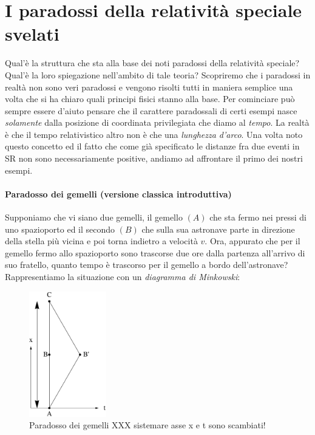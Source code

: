 \documentclass[twoside]{article}
\begin{document}
\section{I paradossi della relatività speciale svelati}\label{sec:paradoxes}
Qual'è la struttura che sta alla base dei noti paradossi della relatività speciale? Qual'è la loro spiegazione nell'ambito di tale teoria? Scopriremo che i paradossi in realtà non sono veri paradossi e vengono risolti tutti in maniera semplice una volta che si ha chiaro quali principi fisici stanno alla base. Per cominciare può sempre essere d'aiuto pensare che il carattere paradossali di certi esempi nasce \emph{solamente} dalla posizione di coordinata privilegiata che diamo al \emph{tempo}. La realtà è che il tempo relativistico altro non è che una \emph{lunghezza d'arco}. Una volta noto questo concetto ed il fatto che come già specificato le distanze fra due eventi in SR non sono necessariamente positive, andiamo ad affrontare il primo dei nostri esempi.

\paragraph{Paradosso dei gemelli (versione classica introduttiva)} 
Supponiamo che vi siano due gemelli, il gemello $(A)$ che sta fermo nei pressi di uno spazioporto ed il secondo $(B)$ che sulla sua astronave parte in direzione della stella più vicina e poi torna indietro a velocità $v$. Ora, appurato che per il gemello fermo allo spazioporto sono trascorse due ore dalla partenza all'arrivo di suo fratello, quanto tempo è trascorso per il gemello a bordo dell'astronave?
Rappresentiamo la situazione con un \emph{diagramma di Minkowski}:
\begin{figure}[htb]
	\centering
	\caption{Paradosso dei gemelli XXX sistemare asse x e t sono scambiati!}
  \includegraphics[width=0.3\textwidth]{images/twinparadox.eps}	
\end{figure}
\end{document}
